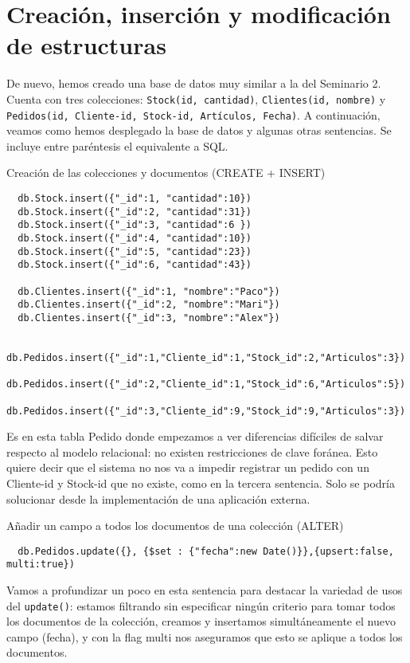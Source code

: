 \chapter{Creación, inserción y modificación de estructuras}
De nuevo, hemos creado una base de datos muy similar a la del Seminario 2. Cuenta con tres colecciones: \texttt{Stock(id, cantidad)}, \texttt{Clientes(id, nombre)} y \texttt{Pedidos(id, Cliente-id, Stock-id, Artículos, Fecha)}. A continuación, veamos como hemos desplegado la base de datos y algunas otras sentencias. Se incluye entre paréntesis el equivalente a SQL.

\bigskip
{\large Creación de las colecciones y documentos (CREATE + INSERT)}
  \begin{lstlisting}
  db.Stock.insert({"_id":1, "cantidad":10})
  db.Stock.insert({"_id":2, "cantidad":31})
  db.Stock.insert({"_id":3, "cantidad":6 })
  db.Stock.insert({"_id":4, "cantidad":10})
  db.Stock.insert({"_id":5, "cantidad":23})
  db.Stock.insert({"_id":6, "cantidad":43})

  db.Clientes.insert({"_id":1, "nombre":"Paco"})
  db.Clientes.insert({"_id":2, "nombre":"Mari"})
  db.Clientes.insert({"_id":3, "nombre":"Alex"})

  db.Pedidos.insert({"_id":1,"Cliente_id":1,"Stock_id":2,"Articulos":3})
  db.Pedidos.insert({"_id":2,"Cliente_id":1,"Stock_id":6,"Articulos":5})
  db.Pedidos.insert({"_id":3,"Cliente_id":9,"Stock_id":9,"Articulos":3})
  \end{lstlisting}

  Es en esta tabla Pedido donde empezamos a ver diferencias difíciles de salvar respecto al modelo relacional: no existen restricciones de clave foránea. Esto quiere decir que el sistema no nos va a impedir registrar un pedido con un Cliente-id y Stock-id que no existe, como en la tercera sentencia. Solo se podría solucionar desde la implementación de una aplicación externa.

\bigskip
{\large Añadir un campo a todos los documentos de una colección (ALTER)}

  \begin{lstlisting}
  db.Pedidos.update({}, {$set : {"fecha":new Date()}},{upsert:false, multi:true})
  \end{lstlisting}

  Vamos a profundizar un poco en esta sentencia para destacar la variedad de usos del \texttt{update()}: estamos filtrando sin especificar ningún criterio para tomar todos los documentos de la colección, creamos y insertamos simultáneamente el nuevo campo (fecha), y con la flag multi nos aseguramos que esto se aplique a todos los documentos.

